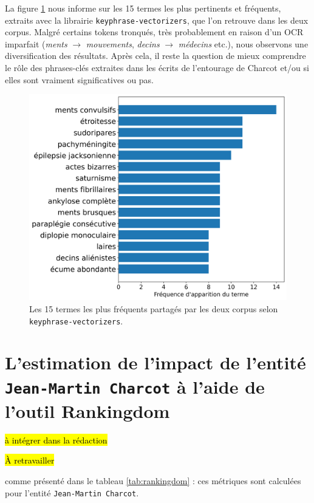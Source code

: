 La figure \ref{fig:patternrank_partage} nous informe sur les 15 termes les plus pertinents et fréquents, extraits avec la librairie \texttt{keyphrase-vectorizers}, que l'on retrouve dans les deux corpus. Malgré certains tokens tronqués, très probablement en raison d'un \textsc{OCR} imparfait (\textit{ments} $\rightarrow$ \textit{mouvements}, \textit{decins} $\rightarrow$ \textit{médecins} etc.), nous observons une diversification des résultats. Après cela, il reste la question de mieux comprendre le rôle des phrases-clés extraites dans les écrits de l'entourage de Charcot et/ou si elles sont vraiment significatives ou pas. 

\begin{figure}[!h]
    \centering
    \includegraphics[width=1\textwidth]{img/termes_partages.png}
    \caption{Les 15 termes les plus fréquents partagés par les deux corpus selon \texttt{keyphrase-vectorizers}.}
    \label{fig:patternrank_partage}
\end{figure}

\section{L'estimation de l'impact de l'entité \texttt{Jean-Martin Charcot} à l'aide de l'outil Rankingdom}
\hl{à intégrer dans la rédaction}

\hl{À retravailler}

comme présenté dans le tableau \ref{tab:rankingdom} : ces métriques sont calculées pour l'entité \texttt{Jean-Martin Charcot}.

